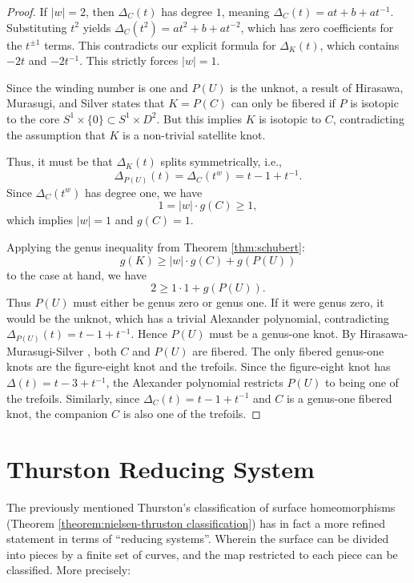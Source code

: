 \begin{proof}
If $|w|=2$, then $\Delta_C(t)$ has degree $1$, meaning $\Delta_C(t) = at + b + at^{-1}$. Substituting $t^2$ yields $\Delta_C(t^2) = at^2 + b + at^{-2}$, which has zero coefficients for the $t^{\pm 1}$ terms. This contradicts our explicit formula for $\Delta_K(t)$, which contains $-2t$ and $-2t^{-1}$. This strictly forces $|w|=1$.

Since the winding number is one and $P(U)$ is the unknot, a result of Hirasawa, Murasugi, and Silver \cite[Corollary 1]{HirasawaMurasugiSilver2008} states that $K = P(C)$ can only be fibered if $P$ is isotopic to the core $S^1 \times \{0\} \subset S^1 \times D^2$. But this implies $K$ is isotopic to $C$, contradicting the assumption that $K$ is a non-trivial satellite knot.

Thus, it must be that $\Delta_K(t)$ splits symmetrically, i.e.,
\[
\Delta_{P(U)}(t) = \Delta_C(t^w) = t - 1 + t^{-1}.
\]
Since $\Delta_C(t^w)$ has degree one, we have
\[
1 = |w| \cdot g(C) \geq 1,
\]
which implies $|w|=1$ and $g(C)=1$.

Applying the genus inequality from Theorem \ref{thm:schubert}:
\[
g(K) \geq |w| \cdot g(C) + g(P(U))
\]
to the case at hand, we have
\[
2 \geq 1 \cdot 1 + g(P(U)).
\]
Thus $P(U)$ must either be genus zero or genus one. If it were genus zero, it would be the unknot, which has a trivial Alexander polynomial, contradicting $\Delta_{P(U)}(t) = t - 1 + t^{-1}$. Hence $P(U)$ must be a genus-one knot. By Hirasawa-Murasugi-Silver \cite{HirasawaMurasugiSilver2008}, both $C$ and $P(U)$ are fibered. The only fibered genus-one knots are the figure-eight knot and the trefoils. Since the figure-eight knot has $\Delta(t) = t - 3 + t^{-1}$, the Alexander polynomial restricts $P(U)$ to being one of the trefoils. Similarly, since $\Delta_C(t) = t - 1 + t^{-1}$ and $C$ is a genus-one fibered knot, the companion $C$ is also one of the trefoils.
\end{proof}

\section{Thurston Reducing System}
The previously mentioned Thurston's classification of surface homeomorphisms (Theorem \ref{theorem:nielsen-thruston classification}) has in fact a more refined statement in terms of ``reducing systems''. Wherein the surface can be divided into pieces by a finite set of curves, and the map restricted to each piece can be classified. More precisely:

